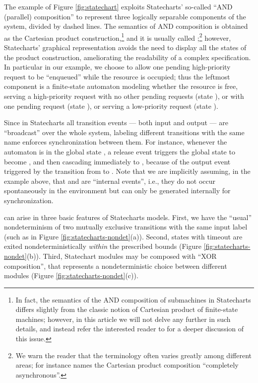 The example of Figure \ref{fig:statechart} exploits Statecharts'
so-called ``AND (parallel) composition'' to represent three logically
separable components of the system, divided by dashed lines. The
semantics of AND composition is obtained as the Cartesian product
construction,\footnote{In fact, the semantics of the AND composition
  of submachines in Statecharts differs slightly from the classic
  notion of Cartesian product of finite-state machines; however, in
  this article we will not delve any further in such details, and
  instead refer the interested reader to \cite{Har87} for a deeper
  discussion of this issue.} and it is usually called
;\footnote{We warn the reader that the
  terminology often varies greatly among different areas; for instance
  \cite{CL99} names the Cartesian product composition ``completely
  asynchronous''.} however, Statecharts' graphical representation
avoids the need to display all the states of the product construction,
ameliorating the readability of a complex specification. In particular
in our example, we choose to allow one pending high-priority request
to be ``enqueued'' while the resource is occupied; thus the leftmost
component is a finite-state automaton modeling whether the resource is
free, serving a high-priority request with no other pending requests
(state ), or with one pending request (state ), or
serving a low-priority request (state ).

Since in Statecharts all transition events --- both input and output 
--- are ``broadcast'' over the whole system, labeling different 
transitions with the same name enforces synchronization between 
them. For instance, whenever the automaton is in the global state , 
a release event  triggers the global state to become , 
and then cascading immediately to , 
because of the output event  triggered by the transition 
from  to . Note that we are implicitly assuming, 
in the example above, that  and  are ``internal events'',
i.e., they do not occur spontaneously in the environment 
but can only be generated internally for synchronization.

 can arise in three basic features of Statecharts 
models. First, we have the ``usual'' nondeterminism of two mutually 
exclusive transitions with the same input label (such as in Figure \ref{fig:statecharts-nondet}(a)). 
Second, states with timeout are exited nondeterministically \emph{within} 
the prescribed bounds (Figure \ref{fig:statecharts-nondet}(b)). Third, Statechart modules 
may be composed with ``XOR composition'', that represents a nondeterministic 
choice between different modules (Figure \ref{fig:statecharts-nondet}(c)). 

